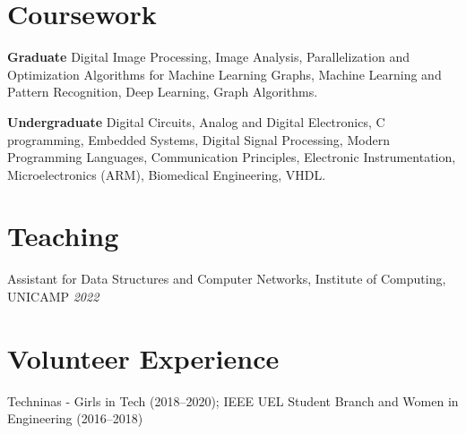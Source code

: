 \documentclass[margin,line]{resume}
\begin{document}
\begin{resume}
    \section{\mysidestyle Coursework}  
      \textbf{Graduate} Digital Image Processing, Image Analysis, Parallelization and Optimization Algorithms for Machine Learning Graphs, Machine Learning and Pattern Recognition,  Deep Learning, Graph Algorithms.
    \vspace{-0.3cm}

      \textbf{Undergraduate} Digital Circuits, Analog and Digital Electronics, C programming, Embedded Systems, Digital Signal Processing, Modern Programming Languages, Communication Principles, Electronic Instrumentation, Microelectronics (ARM), Biomedical Engineering, VHDL.
     \vspace{-0.3cm}
     \section{\mysidestyle Teaching}
             Assistant for Data Structures and Computer Networks, Institute of Computing, UNICAMP \hfill \textsl{2022}
     \vspace{-0.3cm}
     \section{\mysidestyle Volunteer Experience}
        Techninas - Girls in Tech (2018--2020); IEEE UEL Student Branch and Women in Engineering (2016--2018)
     \vspace{-0.3cm}

\end{resume}
\end{document}
